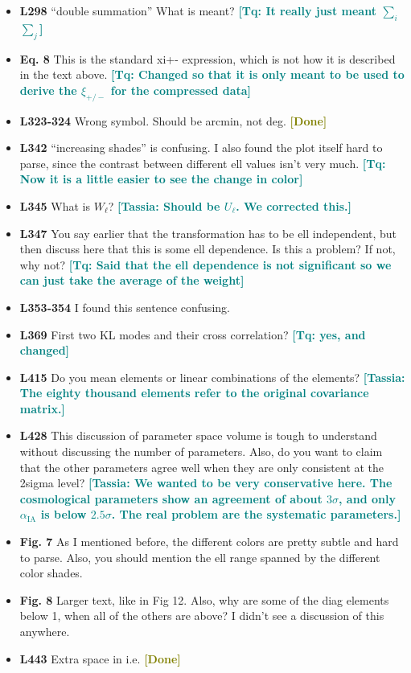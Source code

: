 \documentclass{article}
\newcommand\tassia[1]{{\bf {\textcolor{teal}{[Tassia: #1]}}}}
\newcommand\tq[1]{{\bf {\textcolor{teal}{[Tq: #1]}}}}
\newcommand\done{{\bf {\textcolor{olive}{[Done]}}}}
\begin{document}
\begin{itemize}
	\item \textbf{L298} “double summation” What is meant? \tq{It really just meant $\sum_i$ $\sum_j$}
	\item \textbf{Eq. 8} This is the standard xi+- expression, which is not how it is described in the text above. \tq{Changed so that it is only meant to be used to derive the $\xi_{+/-}$ for the compressed data}
	\item \textbf{L323-324} Wrong symbol. Should be arcmin, not deg. \done
	\item \textbf{L342} “increasing shades” is confusing. I also found the plot itself hard to parse, since the contrast between different ell values isn’t very much. \tq{Now it is a little easier to see the change in color}
	\item \textbf{L345} What is $W_\ell$? \tassia{Should be $U_\ell$. We corrected this.}
	\item \textbf{L347} You say earlier that the transformation has to be ell independent, but then discuss here that this is some ell dependence. Is this a problem? If not, why not? \tq{Said that the ell dependence is not significant so we can just take the average of the weight}
	\item\textbf{ L353-354} I found this sentence confusing. 
	\item \textbf{L369} First two KL modes and their cross correlation? \tq{yes, and changed}
	\item \textbf{L415} Do you mean elements or linear combinations of the elements? \tassia{The eighty thousand elements refer to the original covariance matrix.}
	\item \textbf{L428} This discussion of parameter space volume is tough to understand without discussing the number of parameters.  Also, do you want to claim that the other parameters agree well when they are only consistent at the 2sigma level? \tassia{We wanted to be very conservative here. The cosmological parameters show an agreement of about $3\sigma$, and only $\alpha_{\mathrm{IA}}$ is below $2.5 \sigma$. The real problem are the systematic parameters.}
	\item \textbf{Fig. 7} As I mentioned before, the different colors are pretty subtle and hard to parse. Also, you should mention the ell range spanned by the different color shades.
	\item \textbf{Fig. 8} Larger text, like in Fig 12. Also, why are some of the diag elements below 1, when all of the others are above? I didn’t see a discussion of this anywhere.
	\item \textbf{L443} Extra space in i.e. \done

\end{itemize}
\end{document}
